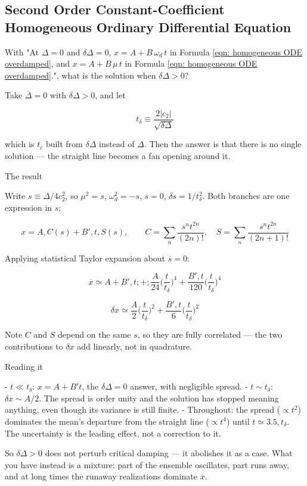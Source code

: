 \documentclass[twoside]{article}
\numberwithin{equation}{section}
\begin{document}
\subsection{Second Order Constant-Coefficient Homogeneous Ordinary Differential Equation}

With "At $\Delta = 0$ and $\delta \Delta = 0$, $x =  A + B\, \omega_d\, t$ in Formula \eqref{eqn: homogeneous ODE overdamped}, and $x =  A + B\, \mu\, t$ in Formula \eqref{eqn: homogeneous ODE overdamped}.", what is the solution when $\delta \Delta > 0$?

Take $\overline{\Delta} = 0$ with $\delta\Delta > 0$, and let

$$t_\delta \equiv \frac{2|c_2|}{\sqrt{\delta\Delta}}$$

which is $t_c$ built from $\delta\Delta$ instead of $\Delta$. Then the answer is that there is no single solution — the straight line becomes a fan opening around it.

The result

Write $s \equiv \Delta/4c_2^2$, so $\mu^2 = s$, $\omega_d^2 = -s$, $\overline{s} = 0$, $\delta s = 1/t_\delta^2$. Both branches are one expression in $s$:

$$x = A,C(s) + B',t,S(s), \qquad C = \sum_n \frac{s^n t^{2n}}{(2n)!}, \quad S = \sum_n \frac{s^n t^{2n}}{(2n+1)!}$$

Applying statistical Taylor expansion about $\overline{s} = 0$:

$$\overline{x} \simeq A + B',t ;+; \frac{A}{24}\Big(\frac{t}{t_\delta}\Big)^{4} + \frac{B',t}{120}\Big(\frac{t}{t_\delta}\Big)^{4}$$

$$\delta x \simeq \frac{A}{2}\Big(\frac{t}{t_\delta}\Big)^{2} + \frac{B',t}{6}\Big(\frac{t}{t_\delta}\Big)^{2}$$

Note $C$ and $S$ depend on the same $s$, so they are fully correlated — the two contributions to $\delta x$ add linearly, not in quadrature.

Reading it

- $t \ll t_\delta$: $x = A + B't$, the $\delta\Delta = 0$ answer, with negligible spread.
- $t \sim t_\delta$: $\delta x \sim A/2$. The spread is order unity and the solution has stopped meaning anything, even though its variance is still finite.
- Throughout: the spread ($\propto t^2$) dominates the mean's departure from the straight line ($\propto t^4$) until $t \simeq 3.5,t_\delta$. The uncertainty is the leading effect, not a correction to it.

So $\delta\Delta > 0$ does not perturb critical damping — it abolishes it as a case. What you have instead is a mixture: part of the ensemble oscillates, part runs away, and at long times the runaway realizations dominate $\overline{x}$.
\end{document}
